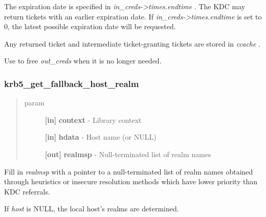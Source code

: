 \documentclass[letterpaper,10pt,english]{sphinxmanual}
\begin{document}
The expiration date is specified in \emph{in\_creds-\textgreater{}times.endtime} . The KDC may return tickets with an earlier expiration date. If \emph{in\_creds-\textgreater{}times.endtime} is set to 0, the latest possible expiration date will be requested.

Any returned ticket and intermediate ticket-granting tickets are stored in \emph{ccache} .

Use {\hyperref[appdev/refs/api/krb5_free_creds:c.krb5_free_creds]{}} to free \emph{out\_creds} when it is no longer needed.


\subsubsection{krb5\_get\_fallback\_host\_realm}
\label{appdev/refs/api/krb5_get_fallback_host_realm:krb5-get-fallback-host-realm}\label{appdev/refs/api/krb5_get_fallback_host_realm::doc}

\begin{fulllineitems}
\label{appdev/refs/api/krb5_get_fallback_host_realm:c.krb5_get_fallback_host_realm}
\end{fulllineitems}

\begin{quote}\begin{description}
\item[{param}] \leavevmode
\textbf{{[}in{]}} \textbf{context} - Library context

\textbf{{[}in{]}} \textbf{hdata} - Host name (or NULL)

\textbf{{[}out{]}} \textbf{realmsp} - Null-terminated list of realm names

\end{description}\end{quote}

Fill in \emph{realmsp} with a pointer to a null-terminated list of realm names obtained through heuristics or insecure resolution methods which have lower priority than KDC referrals.

If \emph{host} is NULL, the local host's realms are determined.
\end{document}
